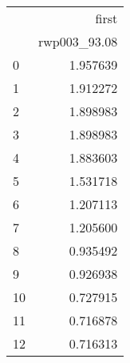 \begin{tabular}{lr}
\toprule
{} &        first \\
{} & rwp003\_93.08 \\
\midrule
0  &     1.957639 \\
1  &     1.912272 \\
2  &     1.898983 \\
3  &     1.898983 \\
4  &     1.883603 \\
5  &     1.531718 \\
6  &     1.207113 \\
7  &     1.205600 \\
8  &     0.935492 \\
9  &     0.926938 \\
10 &     0.727915 \\
11 &     0.716878 \\
12 &     0.716313 \\
\bottomrule
\end{tabular}
